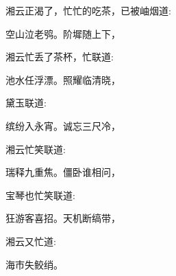 \begin{parag}
    湘云正渴了，忙忙的吃茶，已被岫烟道:
\end{parag}


\begin{poem}
    \begin{pl} 空山泣老鸮。阶墀随上下，\end{pl}
\end{poem}


\begin{parag}
    湘云忙丢了茶杯，忙联道:
\end{parag}


\begin{poem}
    \begin{pl} 池水任浮漂。照耀临清晓，\end{pl}
\end{poem}


\begin{parag}
    黛玉联道:
\end{parag}


\begin{poem}
    \begin{pl} 缤纷入永宵。诚忘三尺冷，\end{pl}
\end{poem}


\begin{parag}
    湘云忙笑联道:
\end{parag}


\begin{poem}
    \begin{pl} 瑞释九重焦。僵卧谁相问，\end{pl}
\end{poem}


\begin{parag}
    宝琴也忙笑联道:
\end{parag}


\begin{poem}
    \begin{pl} 狂游客喜招。天机断缟带，\end{pl}
\end{poem}


\begin{parag}
    湘云又忙道:
\end{parag}


\begin{poem}
    \begin{pl} 海市失鲛绡。\end{pl}
\end{poem}


